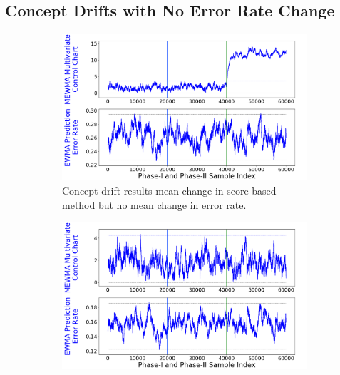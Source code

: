 \documentclass[twoside,11pt]{article}
\begin{document}
\subsection{Concept Drifts with No Error Rate Change}
\begin{figure}[!htp]
\centering
\begin{subfigure}[t]{0.49\linewidth}
         \centering
           \includegraphics[width = \linewidth]{../figures/v14/sim_11/non_nnet_nonunif_ch_f_0_2/1_sim11_logi_1e-08_0_0015_1.png}
         \caption{Concept drift results mean change in score-based method but no mean change in error rate.}
         \label{fig:exp_no_err_ch_a}
  \end{subfigure}
\begin{subfigure}[t]{0.49\linewidth}
         \centering
	       \includegraphics[width = \linewidth]{../figures/v14/sim_11/non_nnet_nonunif_ch_f_0_2_followup/1_sim11_logi_1e-08_0_0015_1.png}

\end{subfigure}
\end{figure}
\end{document}

